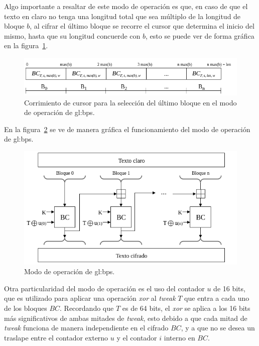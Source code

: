 Algo importante a resaltar de este modo de operación es que, en caso de que el
texto en claro no tenga una longitud total que sea múltiplo de la longitud de
bloque $b$, al cifrar el último bloque se recorre el cursor que determina
el inicio del mismo, hasta que su longitud concuerde con $b$, esto se puede
ver de forma gráfica en la figura~\ref{cursor_BPS}.

\begin{figure}
  \begin{center}
    \includegraphics[width=0.8\linewidth]
    {../../../../diagramas_comunes/bps/cursor_bps}
    \caption{Corrimiento de cursor para la selección del último
      bloque en el modo de operación de \gls{gl:bps}.}
    \label{cursor_BPS}
   \end{center}
\end{figure}

En la figura~\ref{modo_de_operacion_BPS} se ve de manera gráfica el
funcionamiento del modo de operación de \gls{gl:bps}.

\begin{figure}
  \begin{center}
    \includegraphics[width=0.85\linewidth]
    {../../../../diagramas_comunes/bps/modo_de_operacion_bps}
    \caption{Modo de operación de \gls{gl:bps}.}
    \label{modo_de_operacion_BPS}
   \end{center}
\end{figure}

Otra particularidad del modo de operación es el uso del contador $u$ de 16
bits, que es utilizado para aplicar una operación \textit{xor} al
\textit{tweak} $T$ que entra a cada uno de los bloques $BC$. Recordando que $T$
es de 64 bits, el \textit{xor} se aplica a los 16 bits más significativos de
ambas mitades de \textit{tweak}, esto debido a que cada mitad de \textit{tweak}
funciona de manera independiente en el cifrado $BC$, y a que no se desea un
traslape entre el contador externo $u$ y el contador $i$ interno en $BC$.

